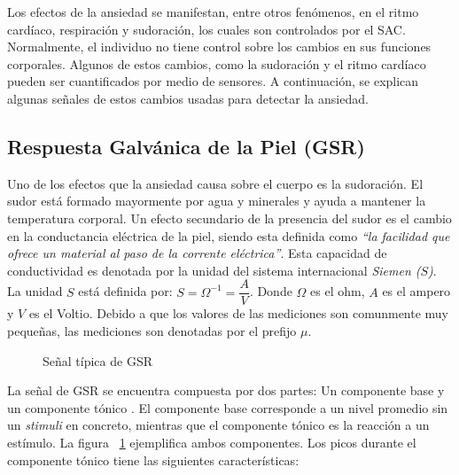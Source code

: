 Los efectos de la ansiedad se manifestan, entre otros fen\'omenos, en el ritmo card\'iaco, respiraci\'on y sudoraci\'on, los cuales son controlados por el SAC. Normalmente, el individuo no tiene control sobre los cambios en sus funciones corporales. Algunos de estos cambios, como la sudoraci\'on y el ritmo card\'iaco pueden ser cuantificados por medio de sensores. A continuaci\'on, se explican algunas se\~nales de estos cambios usadas para detectar la ansiedad.

	\subsection{Respuesta Galv\'anica de la Piel (GSR)}\label{secc:gsr}
	Uno de los efectos que la ansiedad causa sobre el cuerpo es la sudoraci\'on. El sudor est\'a formado mayormente por agua y minerales y ayuda a mantener la temperatura corporal. Un efecto secundario de la presencia del sudor es el cambio en la conductancia el\'ectrica de la piel, siendo esta definida como \textit{``la facilidad que ofrece un material al paso de la corrente el\'ectrica''}. Esta capacidad de conductividad es denotada por la unidad del sistema internacional \textit{Siemen ($S$)}. La unidad $S$ est\'a definida por: $S = \Omega^{-1} = \dfrac{A}{V}$. Donde $\Omega$ es el ohm, $A$ es el ampero y $V$ es el Voltio. Debido a que los valores de las mediciones son comunmente muy peque\~nas, las mediciones son denotadas por el prefijo $\mu$.
	\begin{figure}[h]
		\centering
		\caption{Se\~nal t\'ipica de GSR \label{fig:GSRsignal}}
	\end{figure}

	La se\~nal de GSR se encuentra compuesta por dos partes: Un componente base y un componente t\'onico \citep{Katsis2011261}. El componente base corresponde a un nivel promedio sin un \textit{stimuli} en concreto, mientras que el componente t\'onico es la reacci\'on a un est\'imulo. La figura ~\ref{fig:GSRsignal} ejemplifica ambos componentes. Los picos durante el componente t\'onico tiene las siguientes caracter\'isticas:

